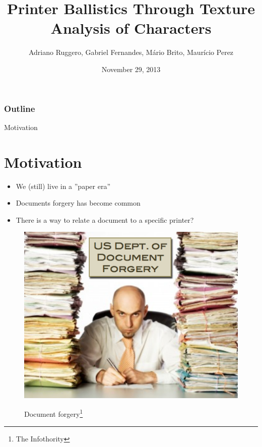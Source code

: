 \documentclass[notes]{beamer}
\title{Printer Ballistics Through Texture Analysis of Characters}
\subtitle{}
\institute{Institute of Computing - Unicamp}
\date{November 29, 2013}
\author{Adriano Ruggero, Gabriel Fernandes, Mário Brito, Maurício Perez}
\begin{document}
\begin{frame}
  \titlepage
\end{frame}

\begin{frame}
  \frametitle{Outline}
  \tableofcontents
\end{frame}

\begin{frame}

\begin{block}{Motivation}
\section{Motivation}
\begin{itemize}

\item We (still) live in a ''paper era''

\item Documents forgery has become common

\item There is a way to relate a document to a specific printer?

\end{itemize}

\end{block}


\begin{figure}[!htb]
\centering
\includegraphics[scale=0.28]{forgery}
\label{fig:forgery}
\caption{Document forgery\footnote{The Infothority\cite{forgery}}}
\end{figure}
{\let\thefootnote\relax\footnotetext{}}
\end{frame}
\end{document}
